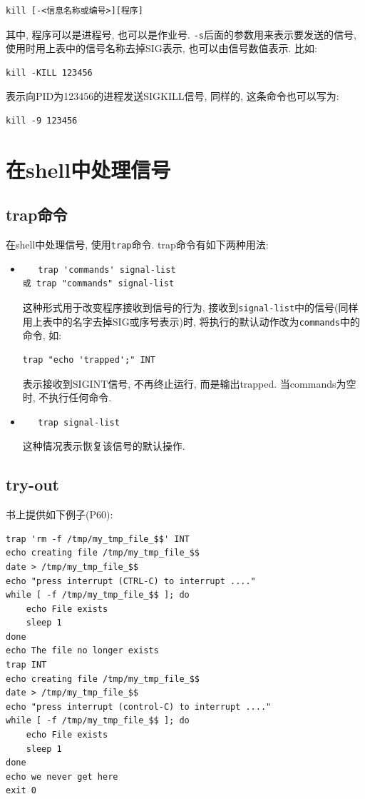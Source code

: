 \documentclass[a4paper]{ctexart}
\begin{document}
\begin{verbatim}
kill [-<信息名称或编号>][程序]
\end{verbatim}

其中, 程序可以是进程号, 也可以是作业号. \verb|-s|后面的参数用来表示要发送的信号, 使用时用上表中的信号名称去掉SIG表示, 也可以由信号数值表示. 比如:

\begin{verbatim}
kill -KILL 123456
\end{verbatim}

表示向PID为123456的进程发送SIGKILL信号, 同样的, 这条命令也可以写为:

\begin{verbatim}
kill -9 123456
\end{verbatim}

\section{在shell中处理信号}
\subsection{trap命令}
在shell中处理信号, 使用\verb|trap|命令. trap命令有如下两种用法:
\begin{itemize}
    \item 
\begin{verbatim}
   trap 'commands' signal-list
或 trap "commands" signal-list
\end{verbatim}

这种形式用于改变程序接收到信号的行为, 接收到\verb!signal-list!中的信号(同样用上表中的名字去掉SIG或序号表示)时, 将执行的默认动作改为\verb|commands|中的命令, 如:
\begin{verbatim}
trap "echo 'trapped';" INT
\end{verbatim}

表示接收到SIGINT信号, 不再终止运行, 而是输出trapped.
当commands为空时, 不执行任何命令.
    \item \begin{verbatim}
   trap signal-list
\end{verbatim}
这种情况表示恢复该信号的默认操作.
\end{itemize}
\subsection{try-out}

书上提供如下例子(P60):
\begin{verbatim}
trap 'rm -f /tmp/my_tmp_file_$$' INT
echo creating file /tmp/my_tmp_file_$$
date > /tmp/my_tmp_file_$$
echo "press interrupt (CTRL-C) to interrupt ...."
while [ -f /tmp/my_tmp_file_$$ ]; do
    echo File exists
    sleep 1
done
echo The file no longer exists
trap INT
echo creating file /tmp/my_tmp_file_$$
date > /tmp/my_tmp_file_$$
echo "press interrupt (control-C) to interrupt ...."
while [ -f /tmp/my_tmp_file_$$ ]; do
    echo File exists
    sleep 1
done
echo we never get here
exit 0
\end{verbatim}
\end{document}
